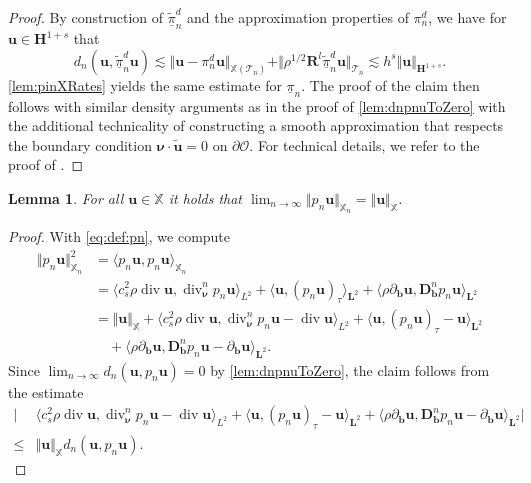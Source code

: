 \documentclass{m2an}
\newcommand{\inner}[1]{\langle #1 \rangle}
\newcommand{\innerr}[1]{\langle \rho#1 \rangle}
\newcommand{\innercsr}[1]{\langle c_s^2 \rho#1 \rangle}
\newcommand{\dom}{\mathcal{O}} %
\newcommand{\nv}{\boldsymbol{\nu}}
\newcommand{\bflow}{\mathbf{b}}
\renewcommand{\u}{\mathbf{u}}
\renewcommand{\div}{\operatorname{div}}
\newcommand{\calT}{\mathcal{T}}
\newcommand{\X}{\mathbb{X}}
\newcommand{\Xn}{\mathbb{X}_n}
\newcommand{\bH}{{\mathbf H}}
\newcommand{\bD}{\mathbf{D}}
\newcommand{\bRl}{\mathbf{R}^{\!l}}
\newcommand{\bL}{\mathbf{L}}
\newcommand{\Tn}{\calT_n}
\newcommand{\diffb}{\partial_{\bflow}}
\newcommand{\ddiffb}{\bD_{\bflow}^n}
\newcommand{\ddiv}{\div_{\nv}^n}
\newcommand{\PVol}[1]{(#1)_{\tau}}
\newcommand{\pinX}{\underline{\pi}_n}
\newcommand{\pinXd}{\underline{\tilde{\pi}}_n^d}
\theoremstyle{plain}
\newtheorem{lemma}[theorem]{Lemma}
\theoremstyle{definition}
\begin{document}
\begin{proof}
   By construction of $\pinXd$ and the approximation properties of $\pi_n^d$, we have for $\u \in \bH^{1+s}$ that
   \begin{equation*}
	   d_n(\u,\pinXd \u) \lesssim \Vert \u - \pi_n^d \u \Vert_{\X(\Tn)} + \Vert \rho^{1/2} \bRl \pinXd \u \Vert_{\Tn} \lesssim h^s \Vert \u \Vert_{\bH^{1+s}}. 
   \end{equation*}
   \cref{lem:pinXRates} yields the same estimate for $\pinX$. 
   The proof of the claim then follows with similar density arguments as in the proof of \cref{lem:dnpnuToZero} with the additional technicality of constructing a smooth approximation that respects the boundary condition $\nv \cdot \tilde{\u} = 0$ on $\partial \dom$. For technical details, we refer to the proof of \cite[Lem.~6]{H23Hdiv}.
\end{proof}




\begin{lemma}\label{lem:pnuToU}
   For all $\u \in \X$ it holds that $\lim_{n \rightarrow \infty} \Vert p_n \u \Vert_{\Xn} = \Vert \u \Vert_{\X}$.
\end{lemma}

\begin{proof}
   With \eqref{eq:def:pn}, we compute  
   \begin{equation*}
      \begin{aligned}
         \Vert p_n \u \Vert_{\Xn}^2 &= \inner{p_n \u, p_n \u}_{\Xn} \\
         &= \innercsr{\div \u, \ddiv p_n \u}_{L^2} + \inner{\u, \PVol{p_n \u}}_{\bL^2} + \innerr{\diffb \u, \ddiffb p_n \u}_{\bL^2} \\
         &= \Vert \u \Vert_{\X} + \innercsr{\div \u, \ddiv p_n \u  - \div \u}_{L^2} + \inner{\u, \PVol{p_n \u} - \u}_{\bL^2} \\
         &\quad + \innerr{\diffb \u, \ddiffb p_n \u - \diffb \u}_{\bL^2}.
      \end{aligned} 
   \end{equation*}
   Since $\lim_{n \to \infty} d_n(\u,p_n \u) = 0$ by \cref{lem:dnpnuToZero}, the claim follows from the estimate 
   \begin{align*}
      \vert  &\innercsr{\div \u, \ddiv p_n \u  - \div \u}_{L^2} + \inner{\u, \PVol{p_n \u}  - \u}_{\bL^2} + \innerr{\diffb \u, \ddiffb p_n \u - \diffb \u}_{\bL^2} \vert \\
      \le &\Vert \u \Vert_{\X} d_n(\u,p_n \u). 
   \end{align*}
\end{proof}
\end{document}
